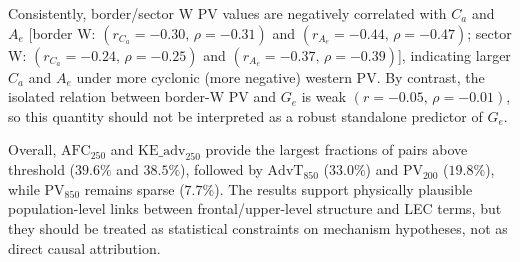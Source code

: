 Consistently, border/sector W PV values are negatively correlated with $C_a$ and $A_e$ [border W: $(r_{C_a}=-0.30,\,\rho=-0.31)$ and $(r_{A_e}=-0.44,\,\rho=-0.47)$; sector W: $(r_{C_a}=-0.24,\,\rho=-0.25)$ and $(r_{A_e}=-0.37,\,\rho=-0.39)$], indicating larger $C_a$ and $A_e$ under more cyclonic (more negative) western PV. By contrast, the isolated relation between border-W PV and $G_e$ is weak $(r=-0.05,\,\rho=-0.01)$, so this quantity should not be interpreted as a robust standalone predictor of $G_e$.

Overall, $\mathrm{AFC}_{250}$ and $\mathrm{KE\_adv}_{250}$ provide the largest fractions of pairs above threshold ($39.6\%$ and $38.5\%$), followed by $\mathrm{AdvT}_{850}$ ($33.0\%$) and $\mathrm{PV}_{200}$ ($19.8\%$), while $\mathrm{PV}_{850}$ remains sparse ($7.7\%$). The results support physically plausible population-level links between frontal/upper-level structure and LEC terms, but they should be treated as statistical constraints on mechanism hypotheses, not as direct causal attribution.